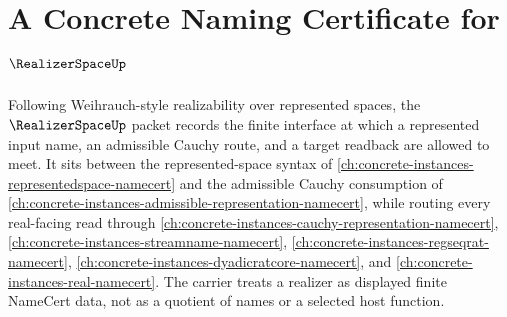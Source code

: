\chapter{A Concrete Naming Certificate for $\RealizerSpaceUp$}
\label{ch:concrete-instances-realizer-space-namecert}

Following Weihrauch-style realizability over represented spaces, the
$\RealizerSpaceUp$ packet records the finite interface at which a represented
input name, an admissible Cauchy route, and a target readback are allowed to
meet. It sits between the represented-space syntax of
\autoref{ch:concrete-instances-representedspace-namecert} and the admissible
Cauchy consumption of
\autoref{ch:concrete-instances-admissible-representation-namecert}, while
routing every real-facing read through
\autoref{ch:concrete-instances-cauchy-representation-namecert},
\autoref{ch:concrete-instances-streamname-namecert},
\autoref{ch:concrete-instances-regseqrat-namecert},
\autoref{ch:concrete-instances-dyadicratcore-namecert}, and
\autoref{ch:concrete-instances-real-namecert}. The carrier treats a realizer as
displayed finite NameCert data, not as a quotient of names or a selected host
function.

